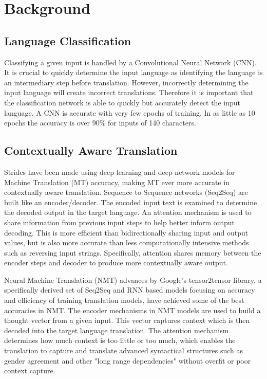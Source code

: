 \documentclass[10pt,a4paper]{article}
\begin{document}
\section{Background}

\subsection{Language Classification}

  Classifying a given input is handled by a Convolutional Neural Network (CNN). It is crucial to quickly determine the input language as identifying the language is an intermediary step before translation. However, incorrectly determining the input language will create incorrect translations. Therefore it is important that the classification network is able to quickly but accurately detect the input language. A CNN is accurate with very few epochs of training. In as little as 10 epochs the accuracy is over 90\% for inputs of 140 characters.  

\subsection{Contextually Aware Translation}

  Strides have been made using deep learning and deep network models for Machine Translation (MT) accuracy, making MT ever more accurate in contextually aware translation. Sequence to Sequence networks (Seq2Seq) are built like an encoder/decoder. The encoded input text is examined to determine the decoded output in the target language. An attention mechanism is used to share information from previous input steps to help better inform output decoding. This is more efficient than bidirectionally sharing input and output values, but is also more accurate than less computationally intensive methods such as reversing input strings. Specifically, attention shares memory between the encoder steps and decoder to produce more contextually aware output.

  Neural Machine Translation (NMT) advances by Google's tensor2tensor library, a specifically derived set of Seq2Seq and RNN based models focusing on accuracy and efficiency of training translation models, have achieved some of the best accuracies in NMT. The encoder mechanisms in NMT models are used to build a thought vector from a given input. This vector captures context which is then decoded into the target language translation. The attention mechanism determines how much context is too little or too much, which enables the translation to capture and translate advanced syntactical structures such as gender agreement and other "long range dependencies" without overfit or poor context capture.
\end{document}
